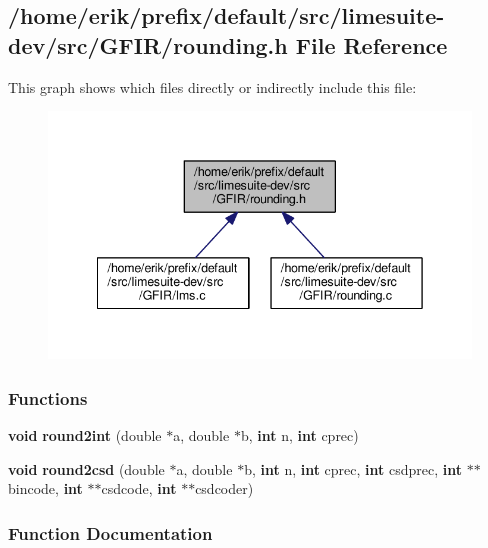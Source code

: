 \subsection{/home/erik/prefix/default/src/limesuite-\/dev/src/\+G\+F\+I\+R/rounding.h File Reference}
\label{rounding_8h}
This graph shows which files directly or indirectly include this file\+:
\nopagebreak
\begin{figure}[H]
\begin{center}
\leavevmode
\includegraphics[width=342pt]{d4/d59/rounding_8h__dep__incl}
\end{center}
\end{figure}
\subsubsection*{Functions}
\begin{DoxyCompactItemize}
\item 
{\bf void} {\bf round2int} (double $\ast$a, double $\ast$b, {\bf int} n, {\bf int} cprec)
\item 
{\bf void} {\bf round2csd} (double $\ast$a, double $\ast$b, {\bf int} n, {\bf int} cprec, {\bf int} csdprec, {\bf int} $\ast$$\ast$bincode, {\bf int} $\ast$$\ast$csdcode, {\bf int} $\ast$$\ast$csdcoder)
\end{DoxyCompactItemize}


\subsubsection{Function Documentation}
